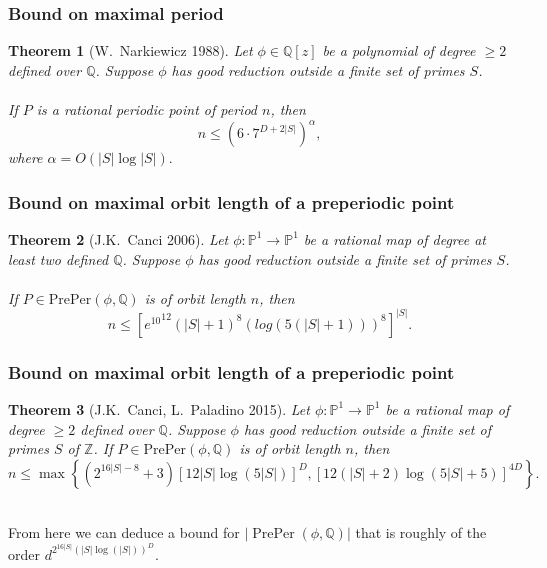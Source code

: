 \documentclass{beamer}
\def\jump{ \quad \\ \vspace{0.7cm} \pause}
\def\PP{{\mathbb P}}
\def\QQ{{\mathbb Q}}
\def\ZZ{{\mathbb Z}}
\DeclareMathOperator{\PrePer}{PrePer}
\theoremstyle{thmstyle}
\theoremstyle{thmstyle}
\newtheorem*{mythm}{Theorem}
\theoremstyle{mystyle}
\theoremstyle{qstnstyle}
\begin{document}
\begin{frame}
\frametitle{Bound on maximal period}
\begin{mythm}[W.\ Narkiewicz 1988]
Let $\phi \in \QQ[z]$ be a polynomial of degree $\geq{2}$ defined over $\QQ$. 
Suppose $\phi$ has good reduction outside a finite set of primes $S$.
\\\quad\\
If $P$ is a rational periodic point of period $n$, then
$$ n \leq (6\cdot 7^{D+2|S|})^\alpha,$$ where $\alpha=O(|S|\log{|S|}).$
\end{mythm}
\end{frame}



\begin{frame}
\frametitle{Bound on maximal orbit length of a preperiodic point}
\begin{mythm}[J.K.\ Canci 2006]
Let $\phi : \PP^1\to\PP^1$ be a rational map of degree at least two
defined $\QQ$. 
Suppose $\phi$ has good reduction outside a finite set of primes $S$.
\\\quad\\
If $P\in\text{PrePer}(\phi,\QQ)$ is of orbit length $n$, then
$$n\leq\left[{e^{10}}^{12}(|S|+1)^8(log(5(|S|+1)))^8\right]^{|S|}.$$
\end{mythm}
\end{frame}

\begin{frame}
\frametitle{Bound on maximal orbit length of a preperiodic point }
\begin{mythm}[J.K.\ Canci, L.\ Paladino 2015]
Let $\phi : \PP^1\to\PP^1$ be a rational map of degree $\geq{2}$
defined over $\QQ$. Suppose $\phi$ has good reduction outside a finite set of primes $S$ of $\ZZ$.
If $P\in\text{PrePer}(\phi,\QQ)$ is of orbit length $n$, then
$$n\leq \max\left\{(2^{16|S|-8}+3)\left[12|S|\log(5|S|)\right]^{D}, \left[12(|S|+2)\log(5|S|+5)\right]^{4D}\right\}
.$$
\end{mythm}
\jump
From here we can deduce a bound for $|\PrePer(\phi,\QQ)| $ that is roughly of the order $\displaystyle d^{2^{16|S|}\left( |S|\log(|S|) \right)^{D}}$.

\end{frame}
\end{document}
